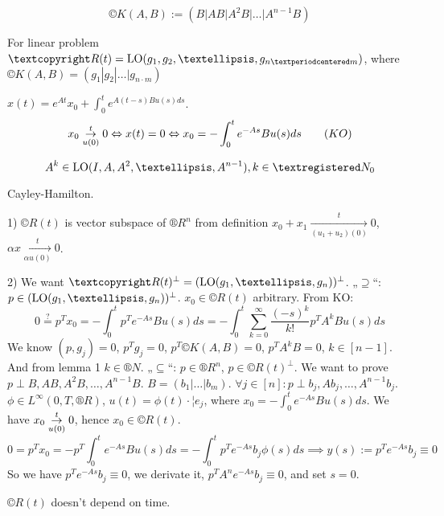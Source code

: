 \documentclass[12pt]{article}					%
\begin{document}
\begin{definice}
	$$ ©K(A, B) := (B | AB | A^2B | … | A^{n-1}B) $$
\end{definice}

\begin{veta}
	For linear problem $©R(t) = \LO (g_1, g_2, …, g_{n·m})$, where $©K(A, B) = (g_1 | g_2 | … | g_{n·m})$

	\begin{tvrzeniin}[Observation]
		$x(t) = e^{At} x_0 + \int_0^t e^{A(t - s) B u(s) ds}$.
		$$ x_0 \underset{u(0)}{\overset{t}\rightarrow} 0 \Leftrightarrow x(t) = 0 \Leftrightarrow x_0 = - \int_0^t e^{-A s} B u(s) ds \qquad (KO) $$
	\end{tvrzeniin}

	\begin{lemmain}[1]
		$$ A^k \in \LO(I, A, A^2, …, A^{n - 1}), k \in ®N_0 $$

		\begin{dukazin}
			Cayley-Hamilton.
		\end{dukazin}
	\end{lemmain}

	\begin{dukazin}
		1) $©R(t)$ is vector subspace of $®R^n$ from definition $x_0 + x_1 \underset{(u_1 + u_2)(0)}{\overset{t}\rightarrow} 0$, $\alpha x \underset{\alpha u(0)}{\overset{t}\rightarrow} 0$.

		2) We want $©R(t)^\perp = (\LO(g_1, …, g_n))^\perp$. „$\supseteq$“: $p \in (\LO(g_1, …, g_n))^\perp$. $x_0 \in ©R(t)$ arbitrary. From KO:
		$$ 0 \overset?= p^T x_0 = -\int_0^t p^Te^{-As} B u(s) ds = - \int_0^t \sum_{k=0}^∞ \frac{(-s)^k}{k!} p^T A^k B u(s) ds$$
		We know $(p, g_j) = 0$, $p^Tg_j = 0$, $p^T ©K(A, B) = 0$, $p^T A^k B = 0$, $k \in [n-1]$. And from lemma 1 $k \in ®N$.
		„$\subseteq$“: $p \in ®R^n$, $p \in ©R(t)^\perp$. We want to prove $p \perp B, AB, A^2B, …, A^{n-1}B$. $B = (b_1 | … | b_m)$. $\forall j \in [n]: p \perp b_j, Ab_j, …, A^{n-1}b_j$. $\phi \in L^∞(0, T, ®R)$, $u(t) = \phi(t)·¦e_j$, where $x_0 = - \int_0^t e^{-A s} B u(s) ds$. We have $x_0 \underset{u(0)}{\overset{t}\rightarrow} 0$, hence $x_0 \in ©R(t)$.
		$$ 0 = p^T x_0 = - p^T\int_0^t e^{-As} B u(s) ds = - \int_0^t p^T e^{-As}b_j \phi(s) ds \implies y(s) := p^T e^{-As}b_j ≡ 0 $$
		So we have $p^T e^{-As} b_j ≡ 0$, we derivate it, $p^T A^n e^{-As} b_j ≡ 0$, and set $s = 0$.
	\end{dukazin}
\end{veta}

\begin{dusledek}
	$©R(t)$ doesn't depend on time.
\end{dusledek}
\end{document}
